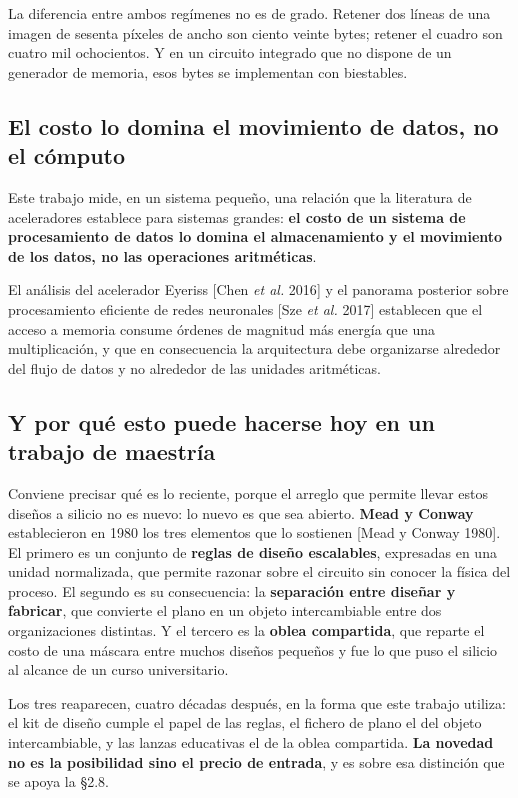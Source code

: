 La diferencia entre ambos regímenes no es de grado. Retener dos líneas
de una imagen de sesenta píxeles de ancho son ciento veinte bytes;
retener el cuadro son cuatro mil ochocientos. Y en un circuito integrado
que no dispone de un generador de memoria, esos bytes se implementan con
biestables.

\subsection{El costo lo domina el movimiento de datos, no el
cómputo}\label{el-costo-lo-domina-el-movimiento-de-datos-no-el-cuxf3mputo}

Este trabajo mide, en un sistema pequeño, una relación que la literatura
de aceleradores establece para sistemas grandes: \textbf{el costo de un
sistema de procesamiento de datos lo domina el almacenamiento y el
movimiento de los datos, no las operaciones aritméticas}.

El análisis del acelerador Eyeriss {[}Chen \emph{et al.} 2016{]} y el
panorama posterior sobre procesamiento eficiente de redes neuronales
{[}Sze \emph{et al.} 2017{]} establecen que el acceso a memoria consume
órdenes de magnitud más energía que una multiplicación, y que en
consecuencia la arquitectura debe organizarse alrededor del flujo de
datos y no alrededor de las unidades aritméticas.

\subsection{Y por qué esto puede hacerse hoy en un trabajo de
maestría}\label{y-por-quuxe9-esto-puede-hacerse-hoy-en-un-trabajo-de-maestruxeda}

Conviene precisar qué es lo reciente, porque el arreglo que permite
llevar estos diseños a silicio no es nuevo: lo nuevo es que sea abierto.
\textbf{Mead y Conway} establecieron en 1980 los tres elementos que lo
sostienen {[}Mead y Conway 1980{]}. El primero es un conjunto de
\textbf{reglas de diseño escalables}, expresadas en una unidad
normalizada, que permite razonar sobre el circuito sin conocer la física
del proceso. El segundo es su consecuencia: la \textbf{separación entre
diseñar y fabricar}, que convierte el plano en un objeto intercambiable
entre dos organizaciones distintas. Y el tercero es la \textbf{oblea
compartida}, que reparte el costo de una máscara entre muchos diseños
pequeños y fue lo que puso el silicio al alcance de un curso
universitario.

Los tres reaparecen, cuatro décadas después, en la forma que este
trabajo utiliza: el kit de diseño cumple el papel de las reglas, el
fichero de plano el del objeto intercambiable, y las lanzas educativas
el de la oblea compartida. \textbf{La novedad no es la posibilidad sino
el precio de entrada}, y es sobre esa distinción que se apoya la §2.8.

